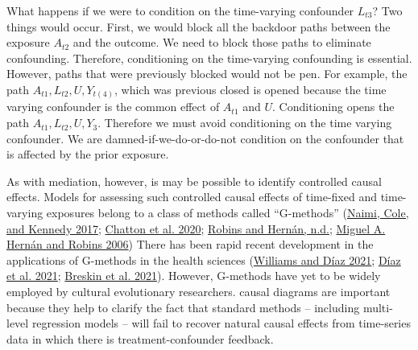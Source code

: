 \documentclass[
  singlecolumn]{report}
\begin{document}
What happens if we were to condition on the time-varying confounder
\(L_{t3}\)? Two things would occur. First, we would block all the
backdoor paths between the exposure \(A_{t2}\) and the outcome. We need
to block those paths to eliminate confounding. Therefore, conditioning
on the time-varying confounding is essential. However, paths that were
previously blocked would not be pen. For example, the path
\(A_{t1}, L_{t2}, U, Y_{t(4)}\), which was previous closed is opened
because the time varying confounder is the common effect of \(A_{t1}\)
and \(U\). Conditioning opens the path \(A_{t1}, L_{t2}, U, Y_{3}\).
Therefore we must avoid conditioning on the time varying confounder. We
are damned-if-we-do-or-do-not condition on the confounder that is
affected by the prior exposure.

As with mediation, however, is may be possible to identify controlled
causal effects. Models for assessing such controlled causal effects of
time-fixed and time-varying exposures belong to a class of methods
called ``G-methods'' (\protect\hyperlink{ref-naimi2017}{Naimi, Cole, and
Kennedy 2017}; \protect\hyperlink{ref-chatton2020}{Chatton et al. 2020};
\protect\hyperlink{ref-robins}{Robins and Hernán, n.d.};
\protect\hyperlink{ref-hernuxe1n2006}{Miguel A. Hernán and Robins 2006})
There has been rapid recent development in the applications of G-methods
in the health sciences (\protect\hyperlink{ref-williams2021}{Williams
and Díaz 2021}; \protect\hyperlink{ref-duxedaz2021}{Díaz et al. 2021};
\protect\hyperlink{ref-breskin2021}{Breskin et al. 2021}). However,
G-methods have yet to be widely employed by cultural evolutionary
researchers. causal diagrams are important because they help to clarify
the fact that standard methods -- including multi-level regression
models -- will fail to recover natural causal effects from time-series
data in which there is treatment-confounder feedback.
\end{document}
